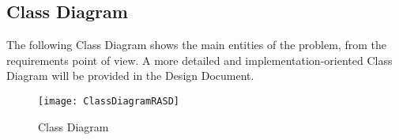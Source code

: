 \subsection{Class Diagram}
The following Class Diagram shows the main entities of the problem, from the requirements point of view.
A more detailed and implementation-oriented Class Diagram will be provided in the Design Document.
\begin{figure}[H] 
\centerline{\texttt{[image: ClassDiagramRASD]}}
\caption{Class Diagram}
\end{figure}




 
 